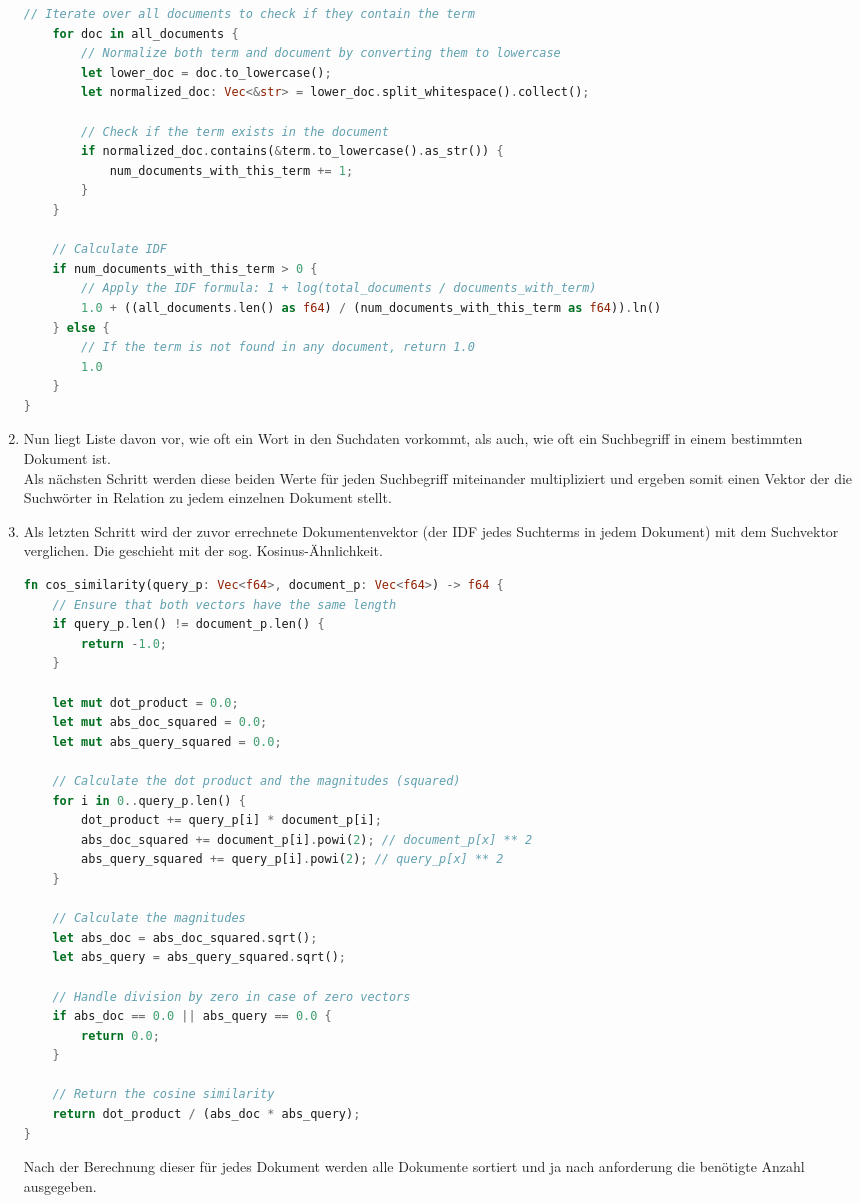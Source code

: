 \begin{enumerate}
\begin{lstlisting}[language=Rust]
    // Iterate over all documents to check if they contain the term
    for doc in all_documents {
        // Normalize both term and document by converting them to lowercase
        let lower_doc = doc.to_lowercase();
        let normalized_doc: Vec<&str> = lower_doc.split_whitespace().collect();

        // Check if the term exists in the document
        if normalized_doc.contains(&term.to_lowercase().as_str()) {
            num_documents_with_this_term += 1;
        }
    }

    // Calculate IDF
    if num_documents_with_this_term > 0 {
        // Apply the IDF formula: 1 + log(total_documents / documents_with_term)
        1.0 + ((all_documents.len() as f64) / (num_documents_with_this_term as f64)).ln()
    } else {
        // If the term is not found in any document, return 1.0
        1.0
    }
}
\end{lstlisting}

    \item Nun liegt Liste davon vor, wie oft ein Wort in den Suchdaten vorkommt, als auch, wie oft ein Suchbegriff in einem bestimmten Dokument ist. \\ Als nächsten Schritt werden diese beiden Werte für jeden Suchbegriff miteinander multipliziert und ergeben somit einen Vektor der die Suchwörter in Relation zu jedem einzelnen Dokument stellt.
    \item Als letzten Schritt wird der zuvor errechnete Dokumentenvektor (der IDF jedes Suchterms in jedem Dokument) mit dem Suchvektor verglichen. Die geschieht mit der sog. Kosinus-Ähnlichkeit.
    \begin{lstlisting}[language=Rust]
fn cos_similarity(query_p: Vec<f64>, document_p: Vec<f64>) -> f64 {
    // Ensure that both vectors have the same length
    if query_p.len() != document_p.len() {
        return -1.0;
    }

    let mut dot_product = 0.0;
    let mut abs_doc_squared = 0.0;
    let mut abs_query_squared = 0.0;

    // Calculate the dot product and the magnitudes (squared)
    for i in 0..query_p.len() {
        dot_product += query_p[i] * document_p[i];
        abs_doc_squared += document_p[i].powi(2); // document_p[x] ** 2
        abs_query_squared += query_p[i].powi(2); // query_p[x] ** 2
    }

    // Calculate the magnitudes
    let abs_doc = abs_doc_squared.sqrt();
    let abs_query = abs_query_squared.sqrt();

    // Handle division by zero in case of zero vectors
    if abs_doc == 0.0 || abs_query == 0.0 {
        return 0.0;
    }

    // Return the cosine similarity
    return dot_product / (abs_doc * abs_query);
}\end{lstlisting}
    Nach der Berechnung dieser für jedes Dokument werden alle Dokumente sortiert und ja nach anforderung die benötigte Anzahl ausgegeben.
\end{enumerate}



